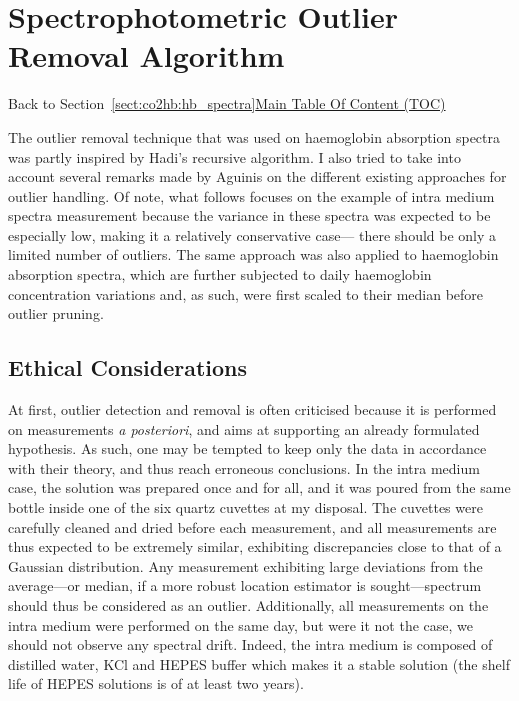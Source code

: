 \chapter{Spectrophotometric Outlier Removal Algorithm}\label{app:pruning_algo}

\begin{appbox}
	Back to Section~\ref{sect:co2hb:hb_spectra}\hfill \hyperref[chapter:toc]{Main Table Of Content (TOC)}
\end{appbox}

The outlier removal technique that was used on haemoglobin absorption spectra was partly inspired by Hadi's recursive algorithm\cite{hadi1992}. I also tried to take into account several remarks made by Aguinis \etal{}\cite{aguinis2013} on the different existing approaches for outlier handling. Of note, what follows focuses on the example of intra medium spectra measurement because the variance in these spectra was expected to be especially low, making it a relatively conservative case---\ie{} there should be only a limited number of outliers. The same approach was also applied to haemoglobin absorption spectra, which are further subjected to daily haemoglobin concentration variations\cite{ward1904} and, as such, were first scaled to their median before outlier pruning.

\section{Ethical Considerations}

At first, outlier detection and removal is often criticised because it is performed on measurements \textit{a posteriori}, and aims at supporting an already formulated hypothesis. As such, one may be tempted to keep only the data in accordance with their theory, and thus reach erroneous conclusions\cite{stefan2023}. In the intra medium case, the solution was prepared once and for all, and it was poured from the same bottle inside one of the six quartz cuvettes at my disposal. The cuvettes were carefully cleaned and dried before each measurement, and all measurements are thus expected to be extremely similar, exhibiting discrepancies close to that of a Gaussian distribution. Any measurement exhibiting large deviations from the average---or median, if a more robust location estimator is sought---spectrum should thus be considered as an outlier. Additionally, all measurements on the intra medium were performed on the same day, but were it not the case, we should not observe any spectral drift. Indeed, the intra medium is composed of distilled water, KCl and HEPES buffer which makes it a stable solution (the shelf life of HEPES solutions is of at least two years\cite{hepes_shelf}).

